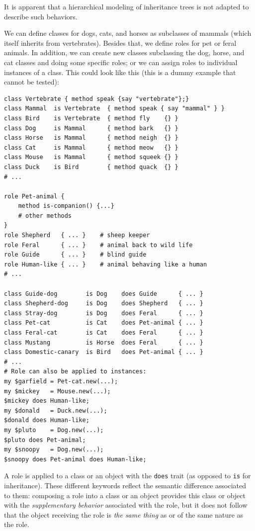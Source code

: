 It is apparent that a hierarchical modeling of inheritance 
trees is not adapted to describe such behaviors. 

  
We can define classes for dogs, cats, and horses as subclasses 
of mammals (which itself inherits from vertebrates). Besides 
that, we define roles for pet or feral animals. In addition, 
we can create new classes subclassing the dog, horse, and cat 
classes and doing some specific roles; or we can assign roles 
to individual instances of a class. This could look like this 
(this is a dummy example that cannot be tested):

\begin{verbatim}
class Vertebrate { method speak {say "vertebrate"};}
class Mammal  is Vertebrate  { method speak { say "mammal" } }
class Bird    is Vertebrate  { method fly    {} }
class Dog     is Mammal      { method bark   {} }
class Horse   is Mammal      { method neigh  {} }
class Cat     is Mammal      { method meow   {} }
class Mouse   is Mammal      { method squeek {} }
class Duck    is Bird        { method quack  {} }
# ...

role Pet-animal { 
    method is-companion() {...} 
    # other methods
}
role Shepherd   { ... }    # sheep keeper
role Feral      { ... }    # animal back to wild life
role Guide      { ... }    # blind guide
role Human-like { ... }    # animal behaving like a human
# ...

class Guide-dog        is Dog    does Guide      { ... }
class Shepherd-dog     is Dog    does Shepherd   { ... }
class Stray-dog        is Dog    does Feral      { ... }
class Pet-cat          is Cat    does Pet-animal { ... }
class Feral-cat        is Cat    does Feral      { ... }
class Mustang          is Horse  does Feral      { ... }
class Domestic-canary  is Bird   does Pet-animal { ... }
# ...
# Role can also be applied to instances:
my $garfield = Pet-cat.new(...);
my $mickey   = Mouse.new(...);
$mickey does Human-like;
my $donald   = Duck.new(...);
$donald does Human-like;
my $pluto    = Dog.new(...);
$pluto does Pet-animal;
my $snoopy   = Dog.new(...);
$snoopy does Pet-animal does Human-like;
\end{verbatim}
 
A role is applied to a class or an object with the {\tt does} 
trait (as opposed to {\tt is} for inheritance). These 
different keywords reflect the semantic difference associated 
to them: composing a role into a class or an object provides 
this class or object with the \emph{supplementary behavior} associated with 
the role, but it does not follow that the object receiving 
the role is \emph{the same thing} as or of the same nature 
as the role.

